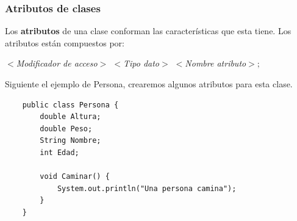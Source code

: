 \subsubsection{Atributos de clases}
\hspace{0.55cm}Los \textbf{atributos} de una clase conforman las características que esta tiene. Los atributos están compuestos por:
\begin{center}
	\textit{$<$Modificador de acceso$>$ $<$Tipo dato$>$ $<$Nombre atributo$>;$}
\end{center}

Siguiente el ejemplo de Persona, crearemos algunos atributos para esta clase.
\begin{lstlisting}
    public class Persona {
        double Altura;
        double Peso;
        String Nombre;
        int Edad;
    
        void Caminar() {
            System.out.println("Una persona camina");
        }
    }
\end{lstlisting}

